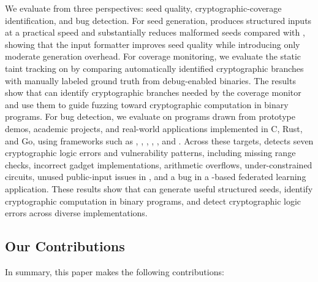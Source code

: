 We evaluate \greyboxfuzz from three perspectives: seed quality, cryptographic-coverage identification, and bug detection. For seed generation, \greyboxfuzz produces structured inputs at a practical speed and substantially reduces malformed seeds compared with \afl, showing that the input formatter improves seed quality while introducing only moderate generation overhead. For coverage monitoring, we evaluate the static taint tracking on \rapidsnark by comparing automatically identified cryptographic branches with manually labeled ground truth from debug-enabled binaries. The results show that \greyboxfuzz can identify cryptographic branches needed by the coverage monitor and use them to guide fuzzing toward cryptographic computation in binary programs. For bug detection, we evaluate \greyboxfuzz on \zksnark programs drawn from prototype demos, academic projects, and real-world applications implemented in C, Rust, and Go, using frameworks such as \rapidsnark, \bellman, \arkworks, \circom, \gnark, and \snarkjs. Across these targets, \greyboxfuzz detects seven cryptographic logic errors and vulnerability patterns, including missing range checks, incorrect gadget implementations, arithmetic overflows, under-constrained circuits, unused public-input issues in \gnark, and a bug in a \zksnark-based federated learning application. These results show that \greyboxfuzz can generate useful structured seeds, identify cryptographic computation in binary programs, and detect cryptographic logic errors across diverse \zksnark implementations.


\subsection{Our Contributions}
In summary, this paper makes the following contributions:

